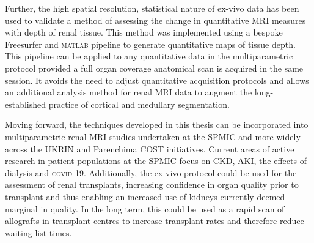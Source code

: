 Further, the high spatial resolution, statistical nature of ex-vivo data has been used to validate a method of assessing the change in quantitative \ac{MRI} measures with depth of renal tissue. This method was implemented using a bespoke Freesurfer and \textsc{matlab} pipeline to generate quantitative maps of tissue depth. This pipeline can be applied to any quantitative data in the multiparametric protocol provided a full organ coverage anatomical scan is acquired in the same session. It avoids the need to adjust quantitative acquisition protocols and allows an additional analysis method for renal \ac{MRI} data to augment the long-established practice of cortical and medullary segmentation.

Moving forward, the techniques developed in this thesis can be incorporated into multiparametric renal \ac{MRI} studies undertaken at the \ac{SPMIC} and more widely across the \ac{UKRIN} and Parenchima \ac{COST} initiatives. Current areas of active research in patient populations at the \ac{SPMIC} focus on \acl{CKD}, \ac{AKI}, the effects of dialysis and \textsc{covid}-19. Additionally, the ex-vivo protocol could be used for the assessment of renal transplants, increasing confidence in organ quality prior to transplant and thus enabling an increased use of kidneys currently deemed marginal in quality. In the long term, this could be used as a rapid scan of allografts in transplant centres to increase transplant rates and therefore reduce waiting list times. 